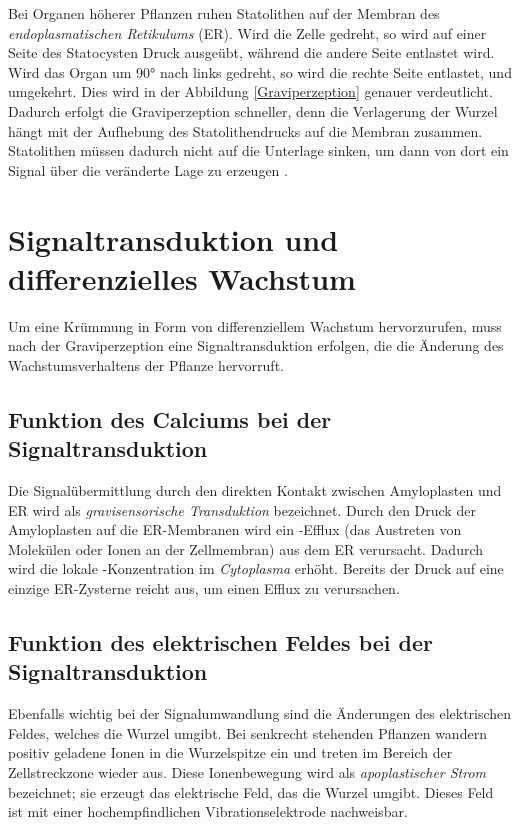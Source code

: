 \documentclass[
11pt, 
ngerman,
listof=totocnumbered,
oneside,
bibliography=totocnumbered,
abstracton
]{scrreprt}
\begin{document}
Bei Organen höherer Pflanzen ruhen Statolithen auf der Membran des \emph{endoplasmatischen Retikulums} (ER). Wird die Zelle gedreht, so wird auf einer Seite des Statocysten Druck ausgeübt, während die andere Seite entlastet wird. Wird das Organ um \ang{90} nach links gedreht, so wird die rechte Seite entlastet, und umgekehrt. Dies wird in der Abbildung \ref{Graviperzeption} genauer verdeutlicht. Dadurch erfolgt die Graviperzeption schneller, denn die Verlagerung der Wurzel hängt mit der Aufhebung des Statolithendrucks auf die Membran zusammen. Statolithen müssen dadurch nicht auf die Unterlage sinken, um dann von dort ein Signal über die veränderte Lage zu erzeugen \parencite[531--532]{Luettge}. 


\section{Signaltransduktion und differenzielles Wachstum}

Um eine Krümmung in Form von differenziellem Wachstum hervorzurufen, muss nach der Graviperzeption eine Signaltransduktion erfolgen, die die Änderung des Wachstumsverhaltens der Pflanze hervorruft. 

\subsection{Funktion des Calciums bei der Signaltransduktion}

Die Signalübermittlung durch den direkten Kontakt zwischen Amyloplasten und ER wird als \emph{gravisensorische Transduktion} bezeichnet.
Durch den Druck der Amyloplasten auf die ER-Membranen wird ein -Efflux (das Austreten von Molekülen oder Ionen an der Zellmembran) aus dem ER verursacht.
Dadurch wird die lokale -Konzentration im  \emph{Cytoplasma} erhöht. 
Bereits der Druck auf eine einzige ER-Zysterne reicht aus, um einen Efflux zu verursachen.

\subsection{Funktion des elektrischen Feldes bei der Signaltransduktion}

Ebenfalls wichtig bei der Signalumwandlung sind die Änderungen des elektrischen Feldes, welches die Wurzel umgibt.
Bei senkrecht stehenden Pflanzen wandern positiv geladene Ionen in die Wurzelspitze ein und treten im Bereich der Zellstreckzone wieder aus. Diese Ionenbewegung wird als \emph{apoplastischer Strom} bezeichnet; sie erzeugt das elektrische Feld, das die Wurzel umgibt. Dieses Feld ist mit einer hochempfindlichen Vibrationselektrode nachweisbar. 
\end{document}
